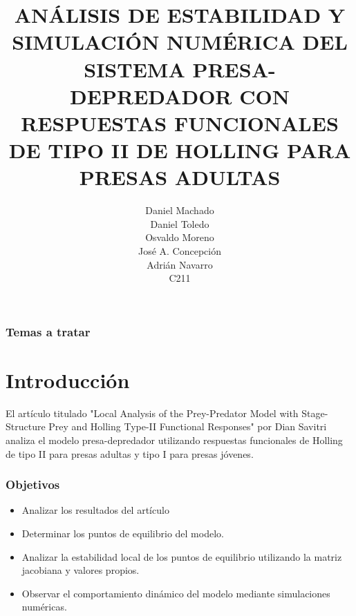 \documentclass{beamer}
\title[T\'itulo del trabajo]{\tiny{ANÁLISIS DE ESTABILIDAD Y SIMULACIÓN NUMÉRICA DEL SISTEMA PRESA-DEPREDADOR CON RESPUESTAS FUNCIONALES DE TIPO II DE HOLLING PARA PRESAS ADULTAS}}
\author[Machado, Toledo, Moreno, Concepci\'on, Navarro]
		{
			Daniel Machado \\
			Daniel Toledo \\
			Osvaldo Moreno \\
			Jos\'e A. Concepci\'on \\
			Adri\'an Navarro \\
			{\small C211}
		}
\date{}
\begin{document}

\begin{frame}
	\frametitle{Temas a tratar}
	\tableofcontents
\end{frame}

\section{Introducci\'on}
\begin{frame}
	\begin{minipage}{10cm}
		El artículo titulado "Local Analysis of the Prey-Predator Model with Stage-Structure Prey and Holling
		Type-II Functional Responses" por Dian Savitri analiza el modelo presa-depredador utilizando respuestas funcionales de Holling de tipo II para presas adultas y tipo I para presas j\'ovenes.
	\end{minipage}
\end{frame}

\begin{frame}
	\frametitle{Objetivos}
	\begin{minipage}{10cm}
		\begin{itemize}
			\item Analizar los resultados del art\'iculo
			\item Determinar los puntos de equilibrio del modelo.
			\item Analizar la estabilidad local de los puntos de equilibrio utilizando la matriz jacobiana y valores propios.
			\item Observar el comportamiento dinámico del modelo mediante
			      simulaciones numéricas.
		\end{itemize}
	\end{minipage}
\end{frame}
\end{document}

